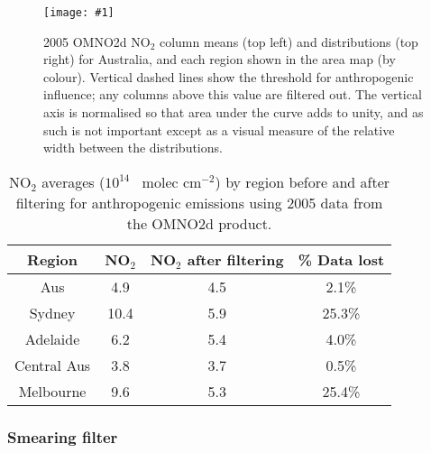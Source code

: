 \documentclass[acp, manuscript]{copernicus}
\newcommand{\moleccm}{~molec cm$^{-2}$}
\newcommand{\mypic}[3]{%
  \begin{figure}
    \texttt{[image: \#1]}
    \caption{#2}
    #3
  \end{figure}
}
\begin{document}
    \mypic{Figures/OMNO2_densities_2005.png}{%
      2005 OMNO2d NO$_2$ column means (top left) and distributions (top right) for Australia, and each region shown in the area map (by colour).
      Vertical dashed lines show the threshold for anthropogenic influence; any columns above this value are filtered out.
      The vertical axis is normalised so that area under the curve adds to unity, and as such is not important except as a visual measure of the relative width between the distributions.
    }{\label{Model:filter:NOx:fig_omno2_densities}}
    
    
    \begin{table}
      \caption{NO$_2$ averages ($10^{14}$ \moleccm) by region before and after filtering for anthropogenic emissions using 2005 data from the OMNO2d product.}
      \begin{tabular}{ c c c c }
        \hline
        \textbf{Region} & \textbf{NO$_2$} & \textbf{NO$_2$ after filtering} & \textbf{\% Data lost} 
        \\ \hline
        Aus         & 4.9  & 4.5  &   2.1\% \\
        Sydney      & 10.4 & 5.9  &  25.3\% \\
        Adelaide    & 6.2  & 5.4  &   4.0\% \\
        Central Aus & 3.8  & 3.7  &   0.5\% \\
        Melbourne   & 9.6  & 5.3  &  25.4\% \\
        \hline
      \end{tabular}
      \label{Model:filter:NOx:tab_summary}
    \end{table}
    
    \subsubsection{Smearing filter}
    \label{Model:filter:smearing}
    
\end{document}
